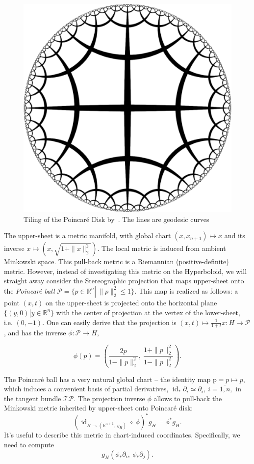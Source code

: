 \begin{figure}
    \center
    \caption{Tiling of the Poincar\'e Disk by~\citet{bulatovConformal}. The lines
    are geodesic curves}
    \includegraphics[width=.8 \linewidth]{art/tiling-disk.pdf}
\end{figure}

The upper-sheet is a metric manifold, with global chart
\( (x, x_{n+1}) \mapsto x \) and its inverse
\( x \mapsto (x, \sqrt{1 + \|x\|_2^2}) \). The local metric is induced from
ambient Minkowski space. This
pull-back metric is a Riemannian (positive-definite) metric. However, instead
of investigating this metric on the Hyperboloid, we will straight away consider
the Stereographic projection that maps upper-sheet onto the \emph{Poincar\'e
ball}
\( \mathcal{P} = \{ p\in\mathbb{R}^n\left|~\|p\|_2^2 \leq 1\right.\}. \)
This map is realized as follows: a point \( (x, t) \) on the upper-sheet is
projected onto the horizontal plane \( \{ (y, 0) \left| y\in
\mathbb{R}^{n}\right. \} \) with the center of projection at the vertex of the
lower-sheet, i.e. \( (0, -1) \). One can easily derive that the projection is \(
(x, t) \mapsto \frac{1}{1+t}x: H\to\mathcal{P} \), and has the inverse \(
\phi:\mathcal{P}\to H, \)

\[ \phi(p) = (\frac{2p}{1 - \|p\|_2^2},~\frac{1+\|p\|_2^2}{1-\|p\|_2^2}). \]

The Poincar\'e ball has a very natural global chart -- the identity map \(
\mathrm{p}=p\mapsto p \), which induces a convenient basis of partial
derivatives,
\( \operatorname{id}_*\partial_i\simeq\partial_i,~i=\overline{1,n}, \) in the
tangent bundle \( \mathcal{T}\mathcal{P} \). The projection inverse \( \phi \)
allows to pull-back the Minkowski metric inherited by upper-sheet onto
Poincar\'e disk: \[ (\operatorname{id}_{H\to(\mathbb{R}^{n+1},~g_H)}\circ~
\phi)^* g_H = \phi^*g_H. \]
It's useful to describe this metric in chart-induced
coordinates. Specifically, we need to compute
\[ g_H(\phi_* \partial_i,~\phi_* \partial_j). \]

